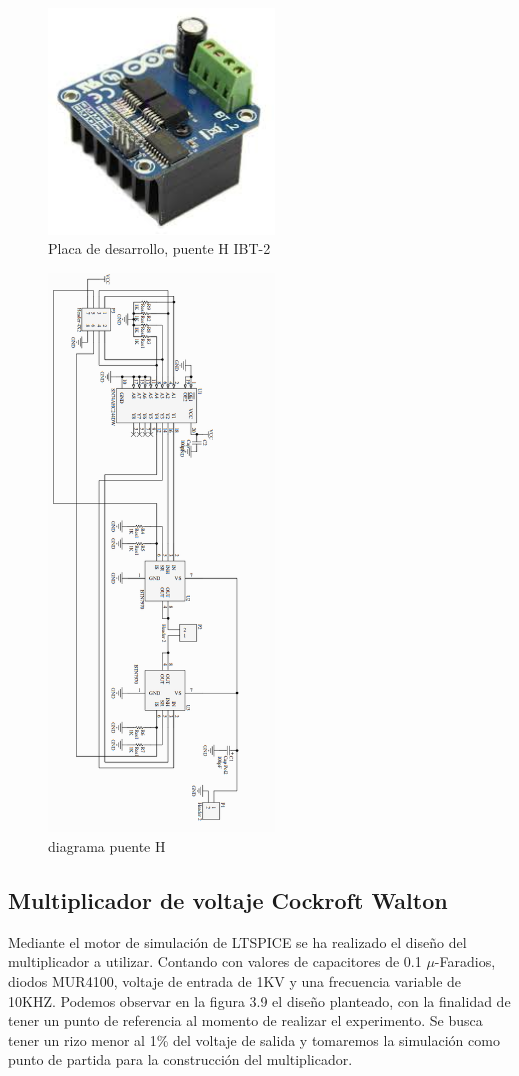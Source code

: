 \begin{figure}[H]
\centering
\includegraphics[width=6cm]{Capitulo3/figs/bts.jpg}
\caption{Placa de desarrollo, puente H IBT-2}
\end{figure}

\begin{figure}[H]
\centering
\includegraphics[width=6cm]{Capitulo3/figs/ibt2.png}
\caption{diagrama puente H}
\end{figure}



\newpage


\subsection{Multiplicador de voltaje Cockroft Walton}
Mediante el motor de simulación de LTSPICE se ha realizado el diseño del multiplicador a utilizar. Contando con valores de capacitores de 0.1 $\mu$-Faradios, diodos MUR4100, voltaje de entrada de 1KV y una frecuencia variable de 10KHZ. Podemos observar en la figura 3.9 el diseño planteado, con la finalidad de tener un punto de referencia al momento de realizar el experimento. Se busca tener un rizo menor al 1\% del voltaje de salida y tomaremos la simulación como punto de partida para la construcción del multiplicador. \\

